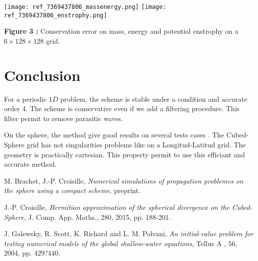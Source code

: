 \documentclass{sciposter}
\begin{document}
\begin{multicols}{3}
\begin{center}
\texttt{[image: ref\_7369437806\_massenergy.png]}
\texttt{[image: ref\_7369437806\_enstrophy.png]}

\textbf{Figure 3  : } Conservation error on mass, energy and potential enstrophy on a $6 \times 128 \times 128$ grid.
\end{center}


\section{Conclusion} 
For a periodic $1D$ problem, the scheme is stable under a condition and accurate order 4. The scheme is conservative even if we add a filtering procedure. This filter permit to remove parasitic waves.

On the sphere, the method give good results on several tests cases \cite{BCyear}. The Cubed-Sphere grid has not singularities problems like on a Longitud-Latitud grid. The geometry is practically cartesian. This property permit to use this efficiant and accurate method.




\begin{thebibliography}{99}
 {\sc M. Brachet, J.-P. Croisille}, \textit{Numerical simulations of propagation problemes on the sphere
using a compact scheme}, preprint.

 {\sc J.-P. Croisille}, \textit{Hermitian approximation of the spherical divergence on the Cubed-Sphere}, J.
Comp. App. Maths., 280, 2015, pp. 188-201.

 {\sc J. Galewsky, R. Scott, K. Richard and L. M. Polvani}, \textit{An initial-value problem for testing
numerical models of the global shallow-water equations}, Tellus A , 56, 2004, pp. 429?440.

\end{thebibliography}

\end{multicols}
\end{document}
